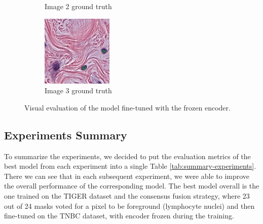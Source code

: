 \begin{figure}[H]
\begin{subfigure}[b]{0.32\textwidth}
    \caption{Image 2 ground truth}
  \end{subfigure}\hfill
  \begin{subfigure}[b]{0.32\textwidth}
    \centering
    \includegraphics[width=\linewidth]{assets/images/for_presentation/exp4-3-gt.png}
    \caption{Image 3 ground truth}
  \end{subfigure}
  \caption{Visual evaluation of the model fine-tuned with the frozen encoder.}
  \label{fig:exp4-results}
\end{figure}

\subsection{Experiments Summary}
To summarize the experiments, we decided to put the evaluation metrics of the best model from each experiment into a single Table \ref{tab:summary-experiments}. There we can see that in each subsequent experiment, we were able to improve the overall performance of the corresponding model. The best model overall is the one trained on the TIGER dataset and the consensus fusion strategy, where 23 out of 24 masks voted for a pixel to be foreground (lymphocyte nuclei) and then fine-tuned on the TNBC dataset, with encoder frozen during the training.

